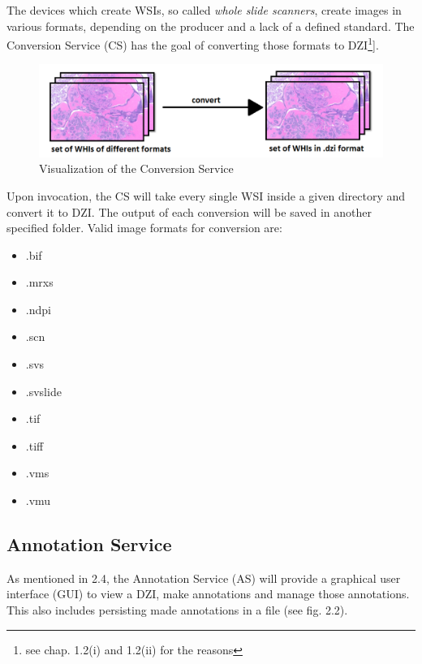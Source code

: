 The devices which create WSIs, so called \emph{whole slide scanners}, create images in various formats, depending on the producer and a lack of a defined standard\cite{Cornish13}. The Conversion Service (CS) has the goal of converting those formats to DZI\footnote{see chap. 1.2(i) and 1.2(ii) for the reasons}].

\begin{figure}[H]
	\begin{center}
		\includegraphics[scale=0.35]{img/processChainA.png}
		\caption{Visualization of the Conversion Service}
		\label{fig:fig2.1}
	\end{center}
\end{figure}

Upon invocation, the CS will take every single WSI inside a given directory and convert it to DZI. The output of each conversion will be saved in another specified folder. Valid image formats for conversion are:

\begin{itemize}
	\item .bif
	\item .mrxs
	\item .ndpi
	\item .scn
	\item .svs
	\item .svslide
	\item .tif
	\item .tiff
	\item .vms
	\item .vmu
\end{itemize}


\subsection{Annotation Service}
As mentioned in 2.4, the Annotation Service (AS) will provide a graphical user interface (GUI) to view a DZI, make annotations and manage those annotations. This also includes persisting made annotations in a file (see fig. 2.2).

